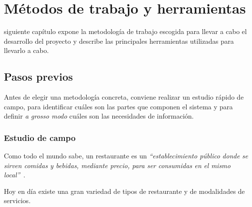 
\chapter{Métodos de trabajo y herramientas}
\label{chap:methods}
 siguiente capítulo expone la metodología de trabajo escogida para
llevar a cabo el desarrollo del proyecto y describe las principales 
herramientas utilizadas para llevarlo a cabo.

\section{Pasos previos}
Antes de elegir una metodología concreta, conviene realizar un estudio rápido
de campo, para identificar cuáles son las partes que componen el sistema y para
definir \emph{a grosso modo} cuáles son las necesidades de información.

  \subsection{Estudio de campo}
  \label{sec:fieldStudy}
Como todo el mundo sabe, un restaurante es un \emph{``establecimiento público 
donde se sirven comidas y bebidas, mediante precio, para ser consumidas en el
mismo local''}~\cite{bib:rae}.

Hoy en día existe una gran variedad de tipos de restaurante y de modalidades
de servicios.

